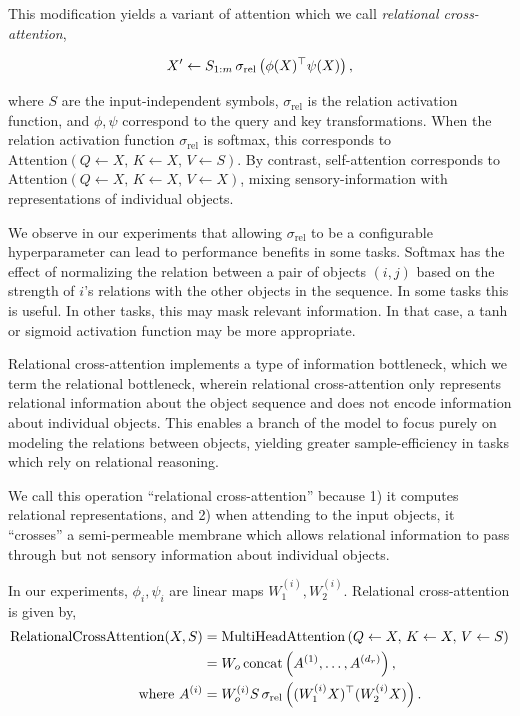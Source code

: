 This modification yields a variant of attention which we call \textit{relational cross-attention},

\begin{equation}\label{eq:relational_crossattn}
    X' \gets S_{1:m} \, \sigma_{\mathrm{rel}}\left(\phi(X)^\top \psi(X)\right),
\end{equation}

where $S$ are the input-independent symbols, $\sigma_{\mathrm{rel}}$ is the relation activation function, and $\phi, \psi$ correspond to the query and key transformations. When the relation activation function $\sigma_{\mathrm{rel}}$ is softmax, this corresponds to $\mathrm{Attention}(Q \gets X,\, K \gets X,\, V \gets S)$. By contrast, self-attention corresponds to $\mathrm{Attention}(Q \gets X,\, K \gets X,\, V \gets X)$, mixing sensory-information with representations of individual objects.

We observe in our experiments that allowing $\sigma_{\mathrm{rel}}$ to be a configurable hyperparameter can lead to performance benefits in some tasks. Softmax has the effect of normalizing the relation between a pair of objects $(i,j)$ based on the strength of $i$'s relations with the other objects in the sequence. In some tasks this is useful. In other tasks, this may mask relevant information. In that case, a tanh or sigmoid activation function may be more appropriate.

Relational cross-attention implements a type of information bottleneck, which we term the relational bottleneck, wherein relational cross-attention only represents relational information about the object sequence and does not encode information about individual objects. This enables a branch of the model to focus purely on modeling the relations between objects, yielding greater sample-efficiency in tasks which rely on relational reasoning.

\begin{remark}
    We call this operation ``relational cross-attention'' because 1) it computes relational representations, and 2) when attending to the input objects, it ``crosses'' a semi-permeable membrane which allows relational information to pass through but not sensory information about individual objects.
\end{remark}

In our experiments, $\phi_i, \psi_i$ are linear maps $W_1^{(i)}, W_2^{(i)}$. Relational cross-attention is given by,
\begin{equation}
    \begin{split}
        \mathrm{RelationalCrossAttention}(X, S) &= \mathrm{MultiHeadAttention}\left(Q \gets X,\, K \gets X,\, V \gets S\right) \\
        &= W_o \, \mathrm{concat}\left(A^{(1)}, \ldots, A^{(d_r)}\right), \\
        \text{where } A^{(i)} &= W_o^{(i)} S \, \sigma_{\mathrm{rel}}\left((W_1^{(i)} X)^\top (W_2^{(i)} X)\right).
    \end{split}
\end{equation}

